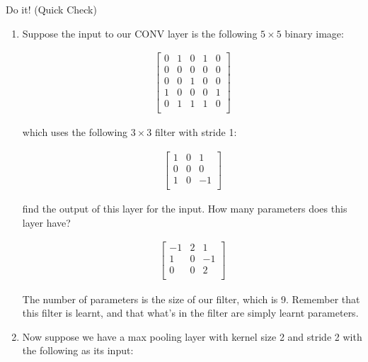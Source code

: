 

\begin{Parts}
\Part Do it! (Quick Check)

\begin{enumerate}
\item Suppose the input to our CONV layer is the following $5 \times 5$ binary image:

\begin{align*}
\begin{bmatrix}
0 & 1 & 0 & 1 & 0 \\
0 & 0 & 0 & 0 & 0 \\
0 & 0 & 1 & 0 & 0 \\
1 & 0 & 0 & 0 & 1 \\
0 & 1 & 1 & 1 & 0 \\
\end{bmatrix}
\end{align*}

which uses the following $3 \times 3$ filter with stride 1:

\begin{align*}
\begin{bmatrix}
1 & 0 & 1 \\
0 & 0 & 0 \\
1 & 0 & -1 \\
\end{bmatrix}
\end{align*}

find the output of this layer for the input. How many parameters does this layer have?

\begin{solution}

\begin{align*}
\begin{bmatrix}
-1 & 2 & 1 \\
1 & 0 & -1 \\
0 & 0 & 2 \\
\end{bmatrix}
\end{align*}

The number of parameters is the size of our filter, which is 9. Remember that this filter is learnt, and that what's in the filter are simply learnt parameters.

\end{solution}

\item Now suppose we have a max pooling layer with kernel size 2 and stride 2 with the following as its input:


\end{enumerate}
\end{Parts}
